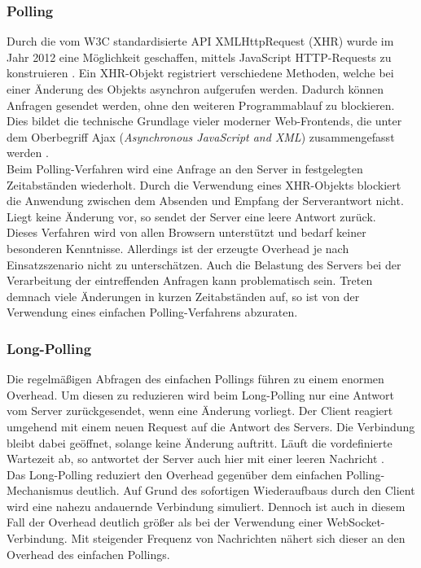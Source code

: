 \documentclass[11pt,a4paper,titlepage]{scrartcl}
\numberwithin{equation}{section}
\begin{document}
\subsubsection{Polling}
Durch die vom W3C standardisierte API XMLHttpRequest (XHR) wurde im Jahr 2012 eine Möglichkeit geschaffen, mittels JavaScript HTTP-Requests zu konstruieren \autocite{whatwg_xmlhttprequest_2006}. Ein XHR-Objekt registriert verschiedene Methoden, welche bei einer Änderung des Objekts asynchron aufgerufen werden. Dadurch können Anfragen gesendet werden, ohne den weiteren Programmablauf zu blockieren. Dies bildet die technische Grundlage vieler moderner Web-Frontends, die unter dem Oberbegriff Ajax (\textit{Asynchronous JavaScript and XML}) zusammengefasst werden \autocite[26]{gorski_websockets_2015}. \\

\noindent Beim Polling-Verfahren wird eine Anfrage an den Server in festgelegten Zeitabständen wiederholt. Durch die Verwendung eines XHR-Objekts blockiert die Anwendung zwischen dem Absenden und Empfang der Serverantwort nicht. Liegt keine Änderung vor, so sendet der Server eine leere Antwort zurück. \\

\noindent Dieses Verfahren wird von allen Browsern unterstützt und bedarf keiner besonderen Kenntnisse. Allerdings ist der erzeugte Overhead je nach Einsatzszenario nicht zu unterschätzen. Auch die Belastung des Servers bei der Verarbeitung der eintreffenden Anfragen kann problematisch sein. Treten demnach viele Änderungen in kurzen Zeitabständen auf, so ist von der Verwendung eines einfachen Polling-Verfahrens abzuraten.

\subsubsection{Long-Polling}\label{subsubsec:Long-Polling}
Die regelmäßigen Abfragen des einfachen Pollings führen zu einem enormen Overhead. Um diesen zu reduzieren wird beim Long-Polling nur eine Antwort vom Server zurückgesendet, wenn eine Änderung vorliegt. Der Client reagiert umgehend mit einem neuen Request auf die Antwort des Servers. Die Verbindung bleibt dabei geöffnet, solange keine Änderung auftritt. Läuft die vordefinierte Wartezeit ab, so antwortet der Server auch hier mit einer leeren Nachricht \autocite[29]{gorski_websockets_2015}. \\

\noindent Das Long-Polling reduziert den Overhead gegenüber dem einfachen Polling-Mechanismus deutlich. Auf Grund des sofortigen Wiederaufbaus durch den Client wird eine nahezu andauernde Verbindung simuliert. Dennoch ist auch in diesem Fall der Overhead deutlich größer als bei der Verwendung einer WebSocket-Verbindung. Mit steigender Frequenz von Nachrichten nähert sich dieser an den Overhead des einfachen Pollings.
\end{document}
